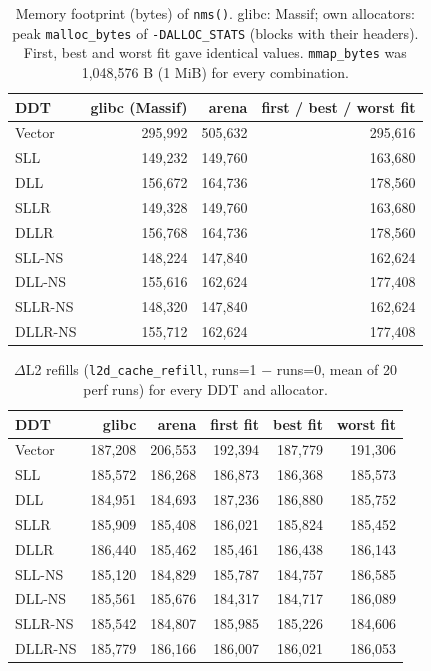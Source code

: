 \documentclass[11pt,a4paper]{article}
\begin{document}
\begin{table}[H]
\centering
\caption{Memory footprint (bytes) of \texttt{nms()}. glibc: Massif; own allocators: peak \texttt{malloc\_bytes} of \texttt{-DALLOC\_STATS} (blocks with their headers). First, best and worst fit gave identical values. \texttt{mmap\_bytes} was 1{,}048{,}576 B (1 MiB) for every combination.}
\label{tab:q3_mem}
\begin{tabular}{@{}lrrr@{}}
\toprule
DDT & glibc (Massif) & arena & first / best / worst fit \\
\midrule
Vector & 295{,}992 & 505{,}632 & 295{,}616 \\
SLL & 149{,}232 & 149{,}760 & 163{,}680 \\
DLL & 156{,}672 & 164{,}736 & 178{,}560 \\
SLLR & 149{,}328 & 149{,}760 & 163{,}680 \\
DLLR & 156{,}768 & 164{,}736 & 178{,}560 \\
SLL-NS & 148{,}224 & 147{,}840 & 162{,}624 \\
DLL-NS & 155{,}616 & 162{,}624 & 177{,}408 \\
SLLR-NS & 148{,}320 & 147{,}840 & 162{,}624 \\
DLLR-NS & 155{,}712 & 162{,}624 & 177{,}408 \\
\bottomrule
\end{tabular}
\end{table}

\begin{table}[H]
\centering
\caption{$\Delta$L2 refills (\texttt{l2d\_cache\_refill}, runs=1 $-$ runs=0, mean of 20 perf runs) for every DDT and allocator.}
\label{tab:q3_l2}
\begin{tabular}{@{}lrrrrr@{}}
\toprule
DDT & glibc & arena & first fit & best fit & worst fit \\
\midrule
Vector & 187{,}208 & 206{,}553 & 192{,}394 & 187{,}779 & 191{,}306 \\
SLL & 185{,}572 & 186{,}268 & 186{,}873 & 186{,}368 & 185{,}573 \\
DLL & 184{,}951 & 184{,}693 & 187{,}236 & 186{,}880 & 185{,}752 \\
SLLR & 185{,}909 & 185{,}408 & 186{,}021 & 185{,}824 & 185{,}452 \\
DLLR & 186{,}440 & 185{,}462 & 185{,}461 & 186{,}438 & 186{,}143 \\
SLL-NS & 185{,}120 & 184{,}829 & 185{,}787 & 184{,}757 & 186{,}585 \\
DLL-NS & 185{,}561 & 185{,}676 & 184{,}317 & 184{,}717 & 186{,}089 \\
SLLR-NS & 185{,}542 & 184{,}807 & 185{,}985 & 185{,}226 & 184{,}606 \\
DLLR-NS & 185{,}779 & 186{,}166 & 186{,}007 & 186{,}021 & 186{,}053 \\
\bottomrule
\end{tabular}
\end{table}
\end{document}
